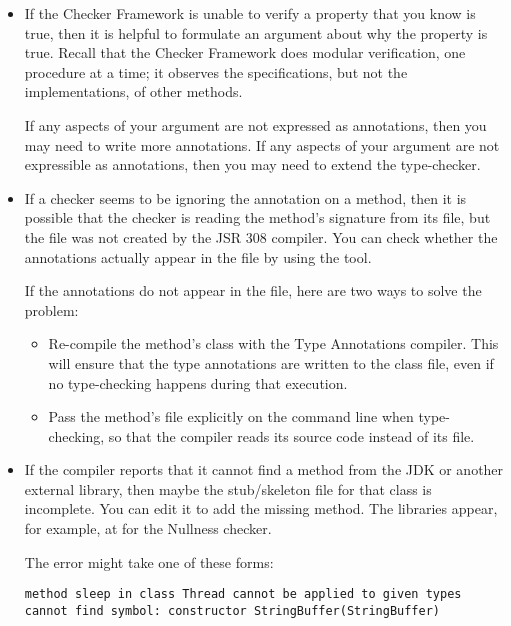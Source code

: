 \begin{itemize}
\item
  If the Checker Framework is unable to verify a property that you know is
  true, then it is helpful to formulate an argument about why the property
  is true.  Recall that the Checker Framework does modular verification,
  one procedure at a time; it observes the specifications, but not the
  implementations, of other methods.

  If any aspects of your argument are not expressed as annotations, then
  you may need to write more annotations.  If any aspects of your argument
  are not expressible as annotations, then you may need to extend the
  type-checker.

\item
If a checker seems to be ignoring the annotation on a method, then it is
possible that the checker is reading the method's signature from its
 file, but the  file was not created by the JSR
308 compiler.  You can check whether the annotations actually appear in the
 file by using the  tool.

If the annotations do not appear in the  file, here are two
ways to solve the problem:
\begin{itemize}
\item
  Re-compile the method's class with the Type Annotations compiler.  This will
  ensure that the type annotations are written to the class file, even if
  no type-checking happens during that execution.
\item
  Pass the method's file explicitly on the command line when type-checking,
  so that the compiler reads its source code instead of its 
  file.
\end{itemize}

\item
If the compiler reports that it cannot find a method from the
JDK or another external library, then maybe the stub/skeleton file for that
class is incomplete.  You can edit it to add the missing method.  The
libraries appear, for example, at  for the
Nullness checker.

The error might take one of these forms:

\begin{Verbatim}
method sleep in class Thread cannot be applied to given types
cannot find symbol: constructor StringBuffer(StringBuffer)
\end{Verbatim}

\end{itemize}



